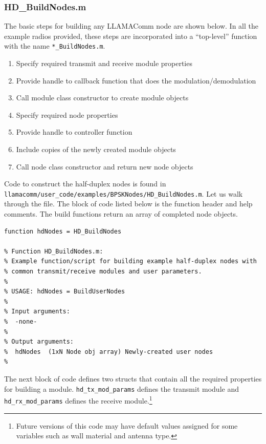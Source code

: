 \subsubsection{HD\_BuildNodes.m}

The basic steps for building any LLAMAComm node are shown below.  In
all the example radios provided, these steps are incorporated into a
``top-level'' function with the name \verb+*_BuildNodes.m+.

\begin{enumerate}
\item Specify required transmit and receive module properties
\item Provide handle to callback function that does the modulation/demodulation
\item Call module class constructor to create module objects
\item Specify required node properties
\item Provide handle to controller function
\item Include copies of the newly created module objects
\item Call node class constructor and return new node objects
\end{enumerate}

Code to construct the half-duplex nodes is found in
\verb+llamacomm/user_code/examples/BPSKNodes/HD_BuildNodes.m+.  
Let us walk through
the file.  The block of code listed below is the function header and
help comments. The build functions return an array of completed node
objects.

\begin{lstlisting}[name=hdBuildNodes]
function hdNodes = HD_BuildNodes

% Function HD_BuildNodes.m:
% Example function/script for building example half-duplex nodes with
% common transmit/receive modules and user parameters.
%
% USAGE: hdNodes = BuildUserNodes
%
% Input arguments:
%  -none-
%
% Output arguments:
%  hdNodes  (1xN Node obj array) Newly-created user nodes
%
\end{lstlisting}

The next block of code defines two structs that contain all the
required properties for building a module. \verb+hd_tx_mod_params+
defines the transmit module and \verb+hd_rx_mod_params+ defines the
receive module.\footnote{Future versions of this code may have
default values assigned for some variables such as wall material and
antenna type.}


